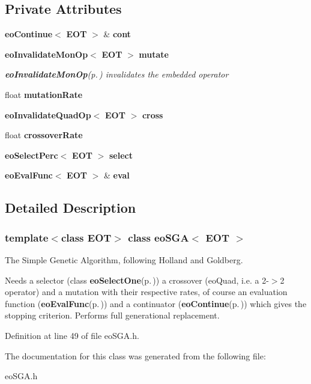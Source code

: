 \subsection*{Private Attributes}
\begin{CompactItemize}
\item 
{\bf eo\-Continue}$<$ {\bf EOT} $>$ \& {\bf cont}\label{classeo_s_g_a_r0}

\item 
{\bf eo\-Invalidate\-Mon\-Op}$<$ {\bf EOT} $>$ {\bf mutate}\label{classeo_s_g_a_r1}

\begin{CompactList}\small\item\em {\bf eo\-Invalidate\-Mon\-Op}{\rm (p.\,\pageref{classeo_invalidate_mon_op})} invalidates the embedded operator \item\end{CompactList}\item 
float {\bf mutation\-Rate}\label{classeo_s_g_a_r2}

\item 
{\bf eo\-Invalidate\-Quad\-Op}$<$ {\bf EOT} $>$ {\bf cross}\label{classeo_s_g_a_r3}

\item 
float {\bf crossover\-Rate}\label{classeo_s_g_a_r4}

\item 
{\bf eo\-Select\-Perc}$<$ {\bf EOT} $>$ {\bf select}\label{classeo_s_g_a_r5}

\item 
{\bf eo\-Eval\-Func}$<$ {\bf EOT} $>$ \& {\bf eval}\label{classeo_s_g_a_r6}

\end{CompactItemize}


\subsection{Detailed Description}
\subsubsection*{template$<$class EOT$>$ class eo\-SGA$<$ EOT $>$}

The Simple Genetic Algorithm, following Holland and Goldberg. 

Needs a selector (class {\bf eo\-Select\-One}{\rm (p.\,\pageref{classeo_select_one})}) a crossover (eo\-Quad, i.e. a 2-$>$2 operator) and a mutation with their respective rates, of course an evaluation function ({\bf eo\-Eval\-Func}{\rm (p.\,\pageref{classeo_eval_func})}) and a continuator ({\bf eo\-Continue}{\rm (p.\,\pageref{classeo_continue})}) which gives the stopping criterion. Performs full generational replacement. 



Definition at line 49 of file eo\-SGA.h.

The documentation for this class was generated from the following file:\begin{CompactItemize}
\item 
eo\-SGA.h\end{CompactItemize}
